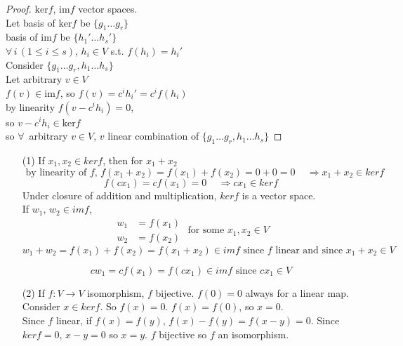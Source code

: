 \documentclass[twoside]{amsart}
\newcommand{\exercisehead}[1]
  {\smallskip
   \noindent{\large\bf Exercise #1.}
   }
\begin{document}
\begin{proof}
  $\text{ker}{f}$, $\text{im}{f}$ vector spaces.  \\

Let basis of $\text{ker}{f}$ be $\lbrace g_1 \dots g_r \rbrace$ \\
\phantom{Let } basis of $\text{im}{f}$ be $\lbrace h_1' \dots h_s' \rbrace$ \\
$\forall \, i \, (1 \leq i \leq s)$, $h_i \in V$ s.t. $f(h_i) = h_i'$ \\

Consider $\lbrace g_1 \dots g_r, h_1 \dots h_s \rbrace$ \\

Let arbitrary $v\in V$ \\
$f(v) \in \text{im}{f}$, so $f(v) = c^i h_i' = c^i f(h_i)$ \\
by linearity $f(v- c^i h_i) = 0$, \\
so $v - c^i h_i \in \text{ker}{f}$ \\
so $\forall \, $ arbitrary $v\in V$, $v$ linear combination of $\lbrace g_1 \dots g_r, h_1 \dots h_s \rbrace$
\end{proof}

\exercisehead{2.8}

\begin{enumerate}
 \item[(1)] If $x_1, x_2 \in ker{f}$, then for $x_1 + x_2$
\[
\text{ by linearity of $f$, } f(x_1 + x_2) = f(x_1) + f(x_2) = 0 + 0 = 0 \quad \, \Longrightarrow x_1 + x_2 \in ker{f}
\]
\[
f(cx_1) = cf(x_1) = 0 \quad \, \Longrightarrow cx_1 \in ker{f}
\]
Under closure of addition and multiplication, $ker{f}$ is a vector space.   \\

If $w_1, \, w_2 \in im{f}$, 
\[
\begin{aligned} w_1 & = f(x_1) \\ w_2 & = f(x_2) \end{aligned} \text{ for some } x_1, x_2 \in V
\]
\[
w_1 + w_2 = f(x_1) + f(x_2) = f(x_1 + x_2) \in im{f} \text{ since $f$ linear and since } x_1 + x_2 \in V
\]

\[
cw_1 = cf(x_1) = f(cx_1) \in im{f} \text{ since } cx_1 \in V
\]
\item[(2)] If $f:V \to V$ isomorphism, $f$ bijective. $f(0)=0$ always for a linear map. Consider $x \in ker{f}$. So $f(x) =0$.  $f(x) = f(0)$, so $x=0$.  \\
Since $f$ linear, if $f(x) = f(y)$, $f(x) - f(y) = f(x-y) =0$.  Since $ker{f} =0$, $x-y =0$ so $x=y$.  $f$ bijective so $f$ an isomorphism.  
\end{enumerate}
\end{document}
